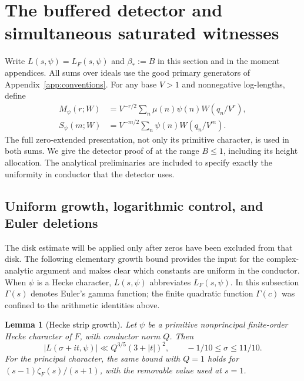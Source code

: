 \documentclass[12pt]{article}
\newtheorem{lemma}[theorem]{Lemma}
\begin{document}
\section{The buffered detector and simultaneous saturated witnesses}\label{sec:detector-complete}
Write \(L(s,\psi)=L_F(s,\psi)\) and \(\beta_*:=B\) in this section and in the moment appendices.  All sums over ideals
use the good primary generators of Appendix~\ref{app:conventions}.
For any base \(V>1\) and nonnegative log-lengths, define
\begin{equation}\label{own:central-polynomials}
 \begin{split}
 M_\psi(r;W)&=V^{-r/2}\sum_n\mu(n)\psi(n)W(q_n/V^r),\\
 S_\psi(m;W)&=V^{-m/2}\sum_n\psi(n)W(q_n/V^m).
 \end{split}
\end{equation}
The full zero-extended presentation, not only its primitive character,
is used in both sums.  We give the detector proof of \cite[Section 8]{QRH}
at the range \(B\le1\), including its height allocation.
The analytical preliminaries are included to specify exactly the
uniformity in conductor that the detector uses.
\subsection{Uniform growth, logarithmic control, and Euler deletions}

The disk estimate will be applied only after zeros have been excluded from
that disk.  The following elementary growth bound provides the input for the
complex-analytic argument and makes clear which constants are uniform in the
conductor.  When $\psi$ is a Hecke character, $L(s,\psi)$ abbreviates
$L_F(s,\psi)$.  In this subsection $\Gamma(s)$ denotes Euler's gamma function;
the finite quadratic function $\Gamma(c)$ was confined to the arithmetic
identities above.

\begin{lemma}[Hecke strip growth]\label{lem:hecke-strip-growth}
Let $\psi$ be a primitive nonprincipal finite-order Hecke character of $F$,
with conductor norm $Q$.  Then
\begin{equation}\label{eq:hecke-growth}
 |L(\sigma+it,\psi)|\ll Q^{3/5}(3+|t|)^2,
 \qquad-1/10\le\sigma\le11/10.
\end{equation}
For the principal character, the same bound with $Q=1$ holds for
$(s-1)\zeta_F(s)/(s+1)$, with the removable value used at $s=1$.
\end{lemma}
\end{document}
